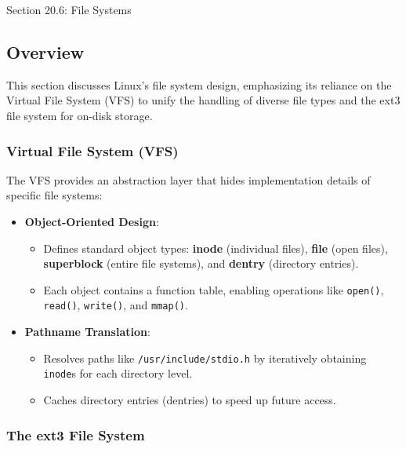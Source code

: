 \begin{notes}{Section 20.6: File Systems}
    \subsection*{Overview}

    This section discusses Linux's file system design, emphasizing its reliance on the Virtual File System (VFS) to unify the handling of diverse file types and the ext3 file system for on-disk 
    storage.
    
    \subsubsection*{Virtual File System (VFS)}
    
    The VFS provides an abstraction layer that hides implementation details of specific file systems:
    \begin{itemize}
        \item \textbf{Object-Oriented Design}:
        \begin{itemize}
            \item Defines standard object types: \textbf{inode} (individual files), \textbf{file} (open files), \textbf{superblock} (entire file systems), and \textbf{dentry} (directory entries).
            \item Each object contains a function table, enabling operations like \texttt{open()}, \texttt{read()}, \texttt{write()}, and \texttt{mmap()}.
        \end{itemize}
        \item \textbf{Pathname Translation}:
        \begin{itemize}
            \item Resolves paths like \texttt{/usr/include/stdio.h} by iteratively obtaining \texttt{inode}s for each directory level.
            \item Caches directory entries (dentries) to speed up future access.
        \end{itemize}
    \end{itemize}
    
    \subsubsection*{The ext3 File System}
    

\end{notes}
